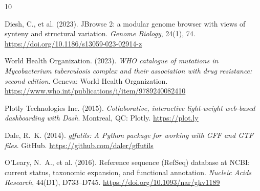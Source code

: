 \documentclass{article}
\begin{document}
\begin{thebibliography}{10}

Diesh, C., et al. (2023).
\newblock JBrowse 2: a modular genome browser with views of synteny and structural variation.
\newblock \emph{Genome Biology}, 24(1), 74.
\newblock \url{https://doi.org/10.1186/s13059-023-02914-z}

World Health Organization. (2023).
\newblock \emph{WHO catalogue of mutations in Mycobacterium tuberculosis complex and their association with drug resistance: second edition}.
\newblock Geneva: World Health Organization.
\newblock \url{https://www.who.int/publications/i/item/9789240082410}

Plotly Technologies Inc. (2015).
\newblock \emph{Collaborative, interactive light-weight web-based dashboarding with Dash}.
\newblock Montreal, QC: Plotly.
\newblock \url{https://plot.ly}

Dale, R.~K. (2014).
\newblock \emph{gffutils: A Python package for working with GFF and GTF files}.
\newblock GitHub.
\newblock \url{https://github.com/daler/gffutils}

O'Leary, N.~A., et al. (2016).
\newblock Reference sequence (RefSeq) database at NCBI: current status, taxonomic expansion, and functional annotation.
\newblock \emph{Nucleic Acids Research}, 44(D1), D733--D745.
\newblock \url{https://doi.org/10.1093/nar/gkv1189}

\end{thebibliography}
\end{document}
